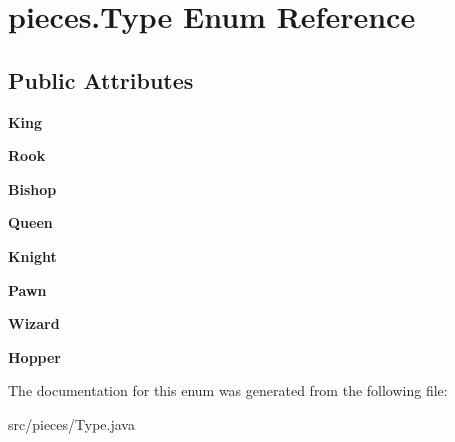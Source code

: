 \hypertarget{enumpieces_1_1_type}{}\section{pieces.\+Type Enum Reference}
\label{enumpieces_1_1_type}
\subsection*{Public Attributes}
\begin{DoxyCompactItemize}
\item 
\mbox{\label{enumpieces_1_1_type_a94a5469a53ed2dc383b045595747ac2e}} 
{\bfseries King}
\item 
\mbox{\label{enumpieces_1_1_type_a7254feb0d571c38a786fc77345c19e44}} 
{\bfseries Rook}
\item 
\mbox{\label{enumpieces_1_1_type_ae0247f7ae0004f10a225be7c8d240ea8}} 
{\bfseries Bishop}
\item 
\mbox{\label{enumpieces_1_1_type_a2393ad0192515b79b7fb7139aee566b2}} 
{\bfseries Queen}
\item 
\mbox{\label{enumpieces_1_1_type_ab19c5ea436b93fd98e23c09fef7943f7}} 
{\bfseries Knight}
\item 
\mbox{\label{enumpieces_1_1_type_a23aa2fdce43266a04b08bccef0cc2ae9}} 
{\bfseries Pawn}
\item 
\mbox{\label{enumpieces_1_1_type_aab9cddf0bc06828bf34b0858ea5f139c}} 
{\bfseries Wizard}
\item 
\mbox{\label{enumpieces_1_1_type_a999780ebdab2950a4ec39a9f1b8ac166}} 
{\bfseries Hopper}
\end{DoxyCompactItemize}


The documentation for this enum was generated from the following file\+:\begin{DoxyCompactItemize}
\item 
src/pieces/Type.\+java\end{DoxyCompactItemize}
